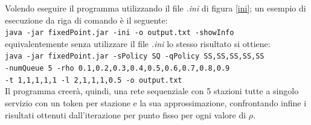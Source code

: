 \documentclass[12pt,a4paper,italian]{article}
\begin{document}
Volendo eseguire il programma utilizzando il file \emph{.ini} di figura \ref{ini}; un esempio di esecuzione da riga di comando è il seguente:\\
\newline
\texttt{java -jar fixedPoint.jar -ini -o output.txt -showInfo}\\
\newline
equivalentemente senza utilizzare il file \emph{.ini} lo stesso risultato si ottiene:\\
\newline
\texttt{java -jar fixedPoint.jar -sPolicy SQ -qPolicy SS,SS,SS,SS,SS\\ 
\quad -numQueue 5 -rho 0.1,0.2,0.3,0.4,0.5,0.6,0.7,0.8,0.9 \\
\quad -t 1,1,1,1,1 -l 2,1,1,1,0.5  -o output.txt}\\
\newline
Il programma creerà, quindi, una rete sequenziale con 5 stazioni tutte a singolo servizio con un token per stazione e la sua approssimazione, confrontando infine i risultati ottenuti dall'iterazione per punto fisso per ogni valore di $\rho$.
\end{document}
